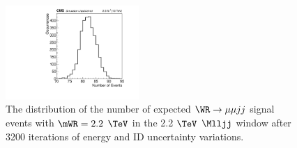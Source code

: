 \begin{figure}[h]
	\centering
	\includegraphics[width=0.45\textwidth]{figures/nEvtsInRangeEnrgyIdSysts_WRMuMuJJ_MWR2000_3200toys.pdf}
	\caption{The distribution of the number of expected $\WR \rightarrow \mu\mu jj$ signal events with $\mWR = 2.2$ $\TeV$ in the 2.2 $\TeV$ 
	$\Mlljj$ window after 3200 iterations of energy and ID uncertainty variations.}
	\label{fig:effectOfEnergyIdUncerts}
\end{figure}



